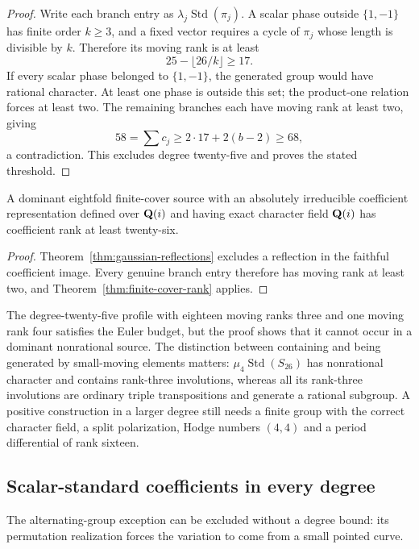 \begin{proof}
Write each branch entry as $\lambda_j\operatorname{Std}(\pi_j)$.
A scalar phase outside $\{1,-1\}$ has finite order $k\ge3$, and a
fixed vector requires a cycle of $\pi_j$ whose length is divisible
by $k$. Therefore its moving rank is at least
\[
 25-\lfloor26/k\rfloor\ge17.
\]
If every scalar phase belonged to $\{1,-1\}$, the generated group
would have rational character. At least one phase is outside this
set; the product-one relation forces at least two. The remaining
branches each have moving rank at least two, giving
\[
 58=\sum c_j\ge2\cdot17+2(b-2)\ge68,
\]
a contradiction. This excludes degree twenty-five and proves the
 stated threshold.
\end{proof}

\begin{corollary}\label{cor:gaussian-cover-rank}
A dominant eightfold finite-cover source with an absolutely irreducible coefficient representation defined over $\mathbf Q(i)$ and having exact character field $\mathbf Q(i)$ has coefficient rank at least twenty-six.
\end{corollary}
\begin{proof}
Theorem~\ref{thm:gaussian-reflections} excludes a reflection in the faithful coefficient image. Every genuine branch entry therefore has moving rank at least two, and Theorem~\ref{thm:finite-cover-rank} applies.
\end{proof}

The degree-twenty-five profile with eighteen moving ranks three and
one moving rank four satisfies the Euler budget, but the proof shows
that it cannot occur in a dominant nonrational source. The distinction
between containing and being generated by small-moving elements matters:
$\mu_4\operatorname{Std}(S_{26})$ has nonrational character and contains
rank-three involutions, whereas all its rank-three involutions are
ordinary triple transpositions and generate a rational subgroup. A
positive construction in a larger degree still needs a finite group
with the correct character field, a split polarization, Hodge numbers
$(4,4)$ and a period differential of rank sixteen.



\subsection{Scalar-standard coefficients in every degree}

The alternating-group exception can be excluded without a degree
bound: its permutation realization forces the variation to come
from a small pointed curve.

